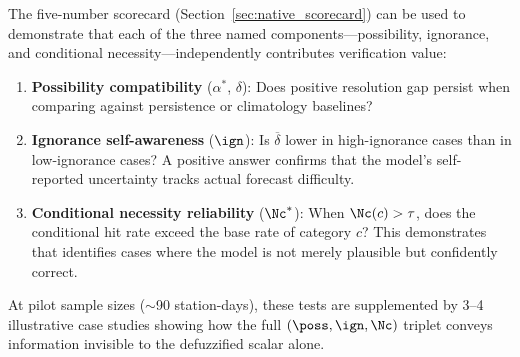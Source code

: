 The five-number scorecard (Section~\ref{sec:native_scorecard}) can be used to demonstrate that each of the three named components---possibility, ignorance, and conditional necessity---independently contributes verification value:

\begin{enumerate}[leftmargin=2em]
\item \textbf{Possibility compatibility} ($\alpha^*$, $\delta$): Does positive resolution gap persist when comparing \clyfar{} against persistence or climatology baselines?
\item \textbf{Ignorance self-awareness} ($\ign$): Is $\overline{\delta}$ lower in high-ignorance cases than in low-ignorance cases? A positive answer confirms that the model's self-reported uncertainty tracks actual forecast difficulty.
\item \textbf{Conditional necessity reliability} ($\Nc^*$): When $\Nc(c) > \tau$, does the conditional hit rate exceed the base rate of category $c$? This demonstrates that \Nc{} identifies cases where the model is not merely plausible but confidently correct.
\end{enumerate}

At pilot sample sizes ($\sim$90 station-days), these tests are supplemented by 3--4 illustrative case studies showing how the full $(\poss, \ign, \Nc)$ triplet conveys information invisible to the defuzzified scalar alone.
